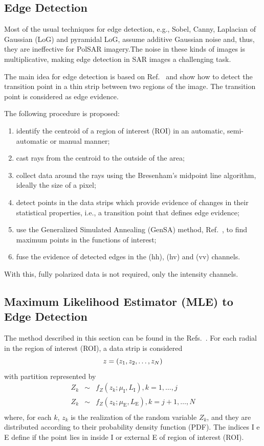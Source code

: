 \documentclass[journal]{IEEEtran}
\begin{document}
\subsection{Edge Detection}

Most of the usual techniques for edge detection, e.g., 
Sobel, Canny, Laplacian of Gaussian (LoG) and pyramidal LoG, assume additive Gaussian noise and, thus, they are ineffective for PolSAR imagery.The noise in these kinds of images is multiplicative, making edge detection in SAR images a challenging task.

The main idea for edge detection is based on Ref.~\cite{nhfc, gmbf} and show how to detect the transition point in a thin strip between two regions of the image. The transition point is considered as edge evidence. 

The following procedure is proposed:
\begin{enumerate}
	\item identify the centroid of a region of interest (ROI) in an automatic, semi-automatic or manual manner;
	\item cast rays from the centroid to the outside of the area;
	\item collect data around the rays using the  Bresenham's midpoint line algorithm, ideally the size of a pixel;
	\item detect points in the data strips which provide evidence of changes in their statistical properties, i.e., a transition point that defines edge evidence;
	\item use the Generalized Simulated Annealing (GenSA) method, Ref.~\cite{xgsh}, to find maximum points in the functions of interest;
	\item fuse the evidence of detected edges in the (hh), (hv) and (vv) channels.
\end{enumerate}
With this, fully polarized data is not required, only the intensity channels.

\subsection{Maximum Likelihood Estimator (MLE) to Edge Detection}

The method described in this section can be found in the Refs.~\cite{gmbf,nhfc}. For each radial in the region of interest (ROI), a data strip is considered
\begin{equation}\nonumber
	z = (z_1,z_2,\dots,z_N) \\
\end{equation}
with partition represented by
\begin{equation}\label{func_max_ver_uni_gamma} 
\begin{array}{lll}
	Z_k&\sim& f_Z(z_k;\mu_\text{I},L_\text{I}), k=1,\dots,j\\
	Z_k&\sim& f_Z(z_k;\mu_\text{E},L_\text{E}), k=j+1,\dots,N\\
\end{array}
\end{equation}
where, for each $k$, $z_k$ is the realization of the random variable $Z_k$, and they are distributed according to their probability density function (PDF). The indices I e E define if the point lies in inside I or external E of region of interest (ROI).
\end{document}
